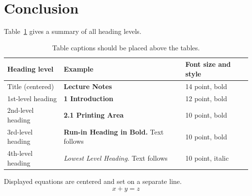 \documentclass[runningheads]{llncs}
\begin{document}



\section{Conclusion} 


Table~\ref{tab1} gives a summary of all heading levels.

\begin{table}
\caption{Table captions should be placed above the
tables.}\label{tab1}
\begin{tabular}{|l|l|l|}
\hline
Heading level &  Example & Font size and style\\
\hline
Title (centered) &  {\Large\bfseries Lecture Notes} & 14 point, bold\\
1st-level heading &  {\large\bfseries 1 Introduction} & 12 point, bold\\
2nd-level heading & {\bfseries 2.1 Printing Area} & 10 point, bold\\
3rd-level heading & {\bfseries Run-in Heading in Bold.} Text follows & 10 point, bold\\
4th-level heading & {\itshape Lowest Level Heading.} Text follows & 10 point, italic\\
\hline
\end{tabular}
\end{table}


\noindent Displayed equations are centered and set on a separate
line.
\begin{equation}
x + y = z
\end{equation}
\end{document}
